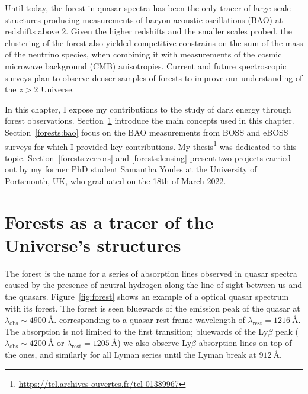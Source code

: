 Until today, the \lya forest in quasar spectra has been the only 
tracer of large-scale structures producing measurements of 
baryon acoustic oscillations (BAO) at redshifts above 2. 
Given the higher redshifts and the smaller scales probed, 
the clustering of the forest also yielded competitive 
constrains on the sum of the mass of the neutrino species, 
when combining it with measurements of the cosmic microwave background (CMB)
anisotropies. Current and future spectroscopic surveys plan to observe  
denser samples of \lya forests to improve our understanding of the 
$z>2$ Universe.

In this chapter, I expose my contributions to the study of
dark energy through \lya forest observations. 
Section~\ref{forests:intro} introduce the main concepts used in 
this chapter. 
Section~\ref{forests:bao} focus on the BAO measurements from 
BOSS and eBOSS surveys for which I provided key contributions.
My thesis\footnote{\url{https://tel.archives-ouvertes.fr/tel-01389967}} 
was dedicated to this topic.
Section~\ref{forests:zerrors} and \ref{forests:lensing} 
present two projects carried out by my former PhD student  
Samantha Youles at the University of Portsmouth, UK, 
who graduated on the 18th of March 2022. 


\section{Forests as a tracer of the Universe's structures}
\label{forests:intro}

The \lya forest is the name for a series of absorption lines observed in quasar
spectra caused by the presence of neutral hydrogen along the line of 
sight between us and the quasars. 
Figure~\ref{fig:forest} shows an example of a optical quasar spectrum with its \lya forest.
The forest is seen bluewards of the \lya emission peak of the quasar at $\lambda_\text{obs} \sim 4900 ~\unit{\angstrom}$.
corresponding to a quasar rest-frame wavelength of $\lambda_\mathrm{rest}= \qty{1216}{\angstrom}$. 
The absorption is not limited to the first transition; bluewards of the 
Ly$\beta$ peak ($\lambda_\text{obs} \sim \qty{4200}{\angstrom}$ or $\lambda_\mathrm{rest} = \qty{1205}{\angstrom}$) 
we also observe Ly$\beta$ absorption lines on top of the \lya ones, and similarly for all
Lyman series until the Lyman break at $\qty{912}{\angstrom}$.

